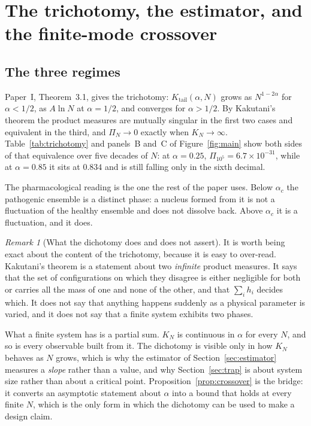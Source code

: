 \documentclass[11pt,reqno]{amsart}
\theoremstyle{plain}
\theoremstyle{definition}
\theoremstyle{remark}
\newtheorem{remark}[theorem]{Remark}
\numberwithin{equation}{section}
\newcommand{\Kt}{K_{\mathrm{tail}}}
\newcommand{\ac}{\alpha_c}
\begin{document}
\section{The trichotomy, the estimator, and the finite-mode crossover}
\label{sec:trichotomy}

\subsection{The three regimes}
Paper~I, Theorem~3.1, gives the trichotomy: $\Kt(\alpha,N)$ grows as $N^{1-2\alpha}$ for $\alpha<1/2$, as $A\ln N$ at $\alpha=1/2$, and converges for $\alpha>1/2$. By Kakutani's theorem the product measures are mutually singular in the first two cases and equivalent in the third, and $\Pi_N\to0$ exactly when $K_N\to\infty$. Table~\ref{tab:trichotomy} and panels~B and~C of Figure~\ref{fig:main} show both sides of that equivalence over five decades of $N$: at $\alpha=0.25$, $\Pi_{10^5}=6.7\times10^{-31}$, while at $\alpha=0.85$ it sits at $0.834$ and is still falling only in the sixth decimal.

The pharmacological reading is the one the rest of the paper uses. Below $\ac$ the pathogenic ensemble is a distinct phase: a nucleus formed from it is not a fluctuation of the healthy ensemble and does not dissolve back. Above $\ac$ it is a fluctuation, and it does.

\begin{remark}[What the dichotomy does and does not assert]
\label{rem:dichotomy}
It is worth being exact about the content of the trichotomy, because it is easy to over-read. Kakutani's theorem is a statement about two \emph{infinite} product measures. It says that the set of configurations on which they disagree is either negligible for both or carries all the mass of one and none of the other, and that $\sum_ih_i$ decides which. It does not say that anything happens suddenly as a physical parameter is varied, and it does not say that a finite system exhibits two phases.

What a finite system has is a partial sum. $K_N$ is continuous in $\alpha$ for every $N$, and so is every observable built from it. The dichotomy is visible only in how $K_N$ behaves as $N$ grows, which is why the estimator of Section~\ref{sec:estimator} measures a \emph{slope} rather than a value, and why Section~\ref{sec:trap} is about system size rather than about a critical point. Proposition~\ref{prop:crossover} is the bridge: it converts an asymptotic statement about $\alpha$ into a bound that holds at every finite $N$, which is the only form in which the dichotomy can be used to make a design claim.
\end{remark}
\end{document}
